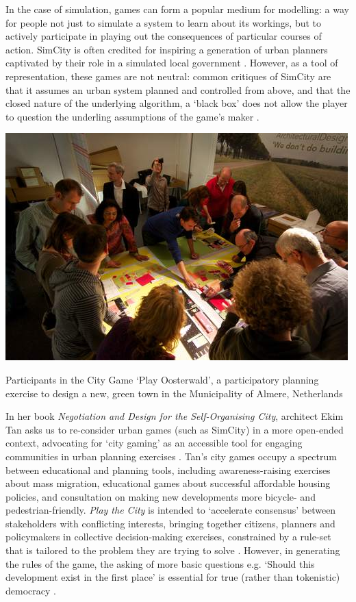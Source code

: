 \documentclass[nofonts,nols,justified,nobib]{tufte-book}
\begin{document}
In the case of simulation, games can form a popular medium for modelling: a way for people not just to simulate a system to learn about its workings, but to actively participate in playing out the consequences of particular courses of action. SimCity is often credited for inspiring a generation of urban planners captivated by their role in a simulated local government \cite{roy_video_2019}. However, as a tool of representation, these games are not neutral: common critiques of SimCity are that it assumes an urban system planned and controlled from above, and that the closed nature of the underlying algorithm, a `black box' does not allow the player to question the underling assumptions of the game's maker \cite{starr_seductions_1994}.

\begin{marginfigure}
\includegraphics[width=\textwidth]{img/1/play-oosterwald.jpg}
\caption{Participants in the City Game `Play Oosterwald', a participatory planning exercise to design a new, green town in the Municipality of Almere, Netherlands \cite{play_the_city_play_2013}}
\end{marginfigure}

In her book \emph{Negotiation and Design for the Self-Organising City}, architect Ekim Tan asks us to re-consider urban games (such as SimCity) in a more open-ended context, advocating for `city gaming' as an accessible tool for engaging communities in urban planning exercises \cite{tan_negotiation_2014}. Tan's city games occupy a spectrum between educational and planning tools, including awareness-raising exercises about mass migration, educational games about successful affordable housing policies, and consultation on making new developments more bicycle- and pedestrian-friendly. \emph{Play the City} is intended to `accelerate consensus' between stakeholders with conflicting interests, bringing together citizens, planners and policymakers in collective decision-making exercises, constrained by a rule-set that is tailored to the problem they are trying to solve \cite{tan_city_2017}. However, in generating the rules of the game, the asking of more basic questions e.g. `Should this development exist in the first place' is essential for true (rather than tokenistic) democracy \cite{shaw_informational_2017}.
\end{document}
